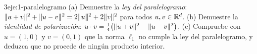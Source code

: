 \begin{ejercicio}{3}{eje:1-paralelogramo}
(a) Demuestre la \emph{ley del paralelogramo}: $\lVert u+v\rVert^{2}+\lVert u-v\rVert^{2}=2\lVert u\rVert^{2}+2\lVert v\rVert^{2}$ para todos $u,v\in\mathbb{R}^{d}$. (b) Demuestre la \emph{identidad de polarización}: $u\cdot v=\tfrac14\bigl(\lVert u+v\rVert^{2}-\lVert u-v\rVert^{2}\bigr)$. (c) Compruebe con $u=(1,0)$ y $v=(0,1)$ que la norma $\ell_1$ no cumple la ley del paralelogramo, y deduzca que no procede de ningún producto interior.
\end{ejercicio}
